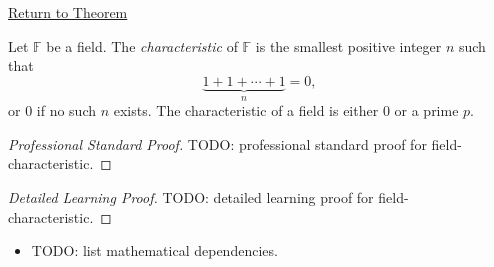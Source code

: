 \newpage
{}
\label{prf:field-characteristic}

\begin{remark*}[Return]
\hyperref[prop:field-characteristic]{Return to Theorem}
\end{remark*}

\begin{proposition*}
Let $\mathbb{F}$ be a field. The \emph{characteristic} of $\mathbb{F}$
is the smallest positive integer $n$ such that
\[
\underbrace{1 + 1 + \cdots + 1}_{n} = 0,
\]
or $0$ if no such $n$ exists.
The characteristic of a field is either $0$ or a prime $p$.
\end{proposition*}

\begin{proof}[Professional Standard Proof]
\LRAProofBodyStart
TODO: professional standard proof for field-characteristic.
\end{proof}

\begin{proof}[Detailed Learning Proof]
\LRAProofBodyStart
TODO: detailed learning proof for field-characteristic.
\end{proof}

\begin{remark*}
\end{remark*}

\begin{dependencies}
\begin{itemize}
  \item TODO: list mathematical dependencies.
\end{itemize}
\end{dependencies}

\clearpage
